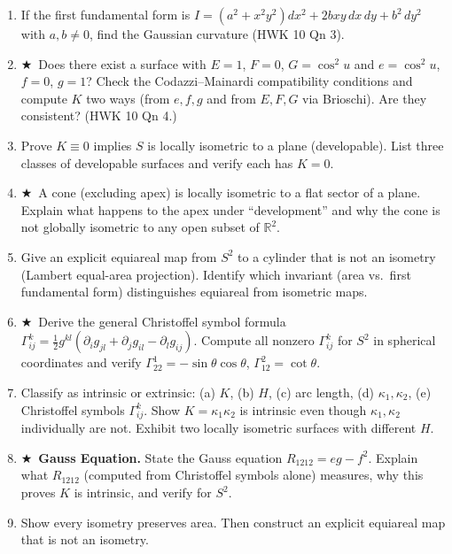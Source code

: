 \documentclass[11pt, a4paper]{article}
\newcommand{\R}{\mathbb{R}}
\newcommand{\kp}{\kappa}
\newcommand{\hard}{$\bigstar$\ }
\begin{document}
\begin{enumerate}[label=\textbf{Q\arabic*.}, leftmargin=*, itemsep=6pt]
\item If the first fundamental form is $I=(a^2+x^2y^2)dx^2+2bxy\,dx\,dy+b^2\,dy^2$ with $a,b\neq 0$, find the Gaussian curvature (HWK 10 Qn 3).

\item \hard Does there exist a surface with $E=1$, $F=0$, $G=\cos^2 u$ and $e=\cos^2 u$, $f=0$, $g=1$? Check the Codazzi--Mainardi compatibility conditions and compute $K$ two ways (from $e,f,g$ and from $E,F,G$ via Brioschi). Are they consistent? (HWK 10 Qn 4.)

\item Prove $K\equiv 0$ implies $S$ is locally isometric to a plane (developable). List three classes of developable surfaces and verify each has $K=0$.

\item \hard A cone (excluding apex) is locally isometric to a flat sector of a plane. Explain what happens to the apex under ``development'' and why the cone is not globally isometric to any open subset of $\R^2$.

\item Give an explicit equiareal map from $S^2$ to a cylinder that is not an isometry (Lambert equal-area projection). Identify which invariant (area vs.\ first fundamental form) distinguishes equiareal from isometric maps.

\item \hard Derive the general Christoffel symbol formula $\Gamma_{ij}^k=\tfrac{1}{2}g^{kl}(\partial_ig_{jl}+\partial_jg_{il}-\partial_lg_{ij})$. Compute all nonzero $\Gamma_{ij}^k$ for $S^2$ in spherical coordinates and verify $\Gamma_{22}^1=-\sin\theta\cos\theta$, $\Gamma_{12}^2=\cot\theta$.

\item Classify as intrinsic or extrinsic: (a) $K$, (b) $H$, (c) arc length, (d) $\kp_1,\kp_2$, (e) Christoffel symbols $\Gamma_{ij}^k$. Show $K=\kp_1\kp_2$ is intrinsic even though $\kp_1,\kp_2$ individually are not. Exhibit two locally isometric surfaces with different $H$.

\item \hard \textbf{Gauss Equation.} State the Gauss equation $R_{1212}=eg-f^2$. Explain what $R_{1212}$ (computed from Christoffel symbols alone) measures, why this proves $K$ is intrinsic, and verify for $S^2$.

\item Show every isometry preserves area. Then construct an explicit equiareal map that is not an isometry.


\end{enumerate}
\end{document}

